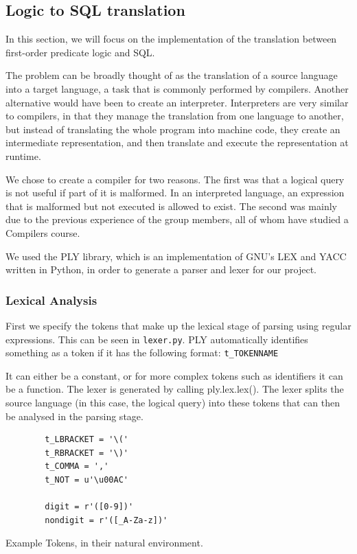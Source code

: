 \documentclass[a4paper, 11pt]{article}
\begin{document}
    \subsection{Logic to SQL translation}
      In this section, we will focus on the implementation of the translation
      between first-order predicate logic and SQL.

      The problem can be broadly thought of as the translation of a source
      language into a target language, a task that is commonly performed by
      compilers. Another alternative would have been to create an interpreter.
      Interpreters are very similar to compilers, in that they manage the
      translation from one language to another, but instead of translating the
      whole program into machine code, they create an intermediate
      representation, and then translate and execute the representation at
      runtime.

      We chose to create a compiler for two reasons. The first was that a
      logical query is not useful if part of it is malformed. In an interpreted
      language, an expression that is malformed but not executed is allowed to
      exist. The second was mainly due to the previous experience of the group
      members, all of whom have studied a Compilers course.

      We used the PLY library, which is an implementation of GNU's LEX and YACC
      written in Python, in order to generate a parser and lexer for our
      project.
    \subsubsection{Lexical Analysis}

      First we specify the tokens that make up the lexical stage of parsing
      using regular expressions. This can be seen in
      \texttt{lexer.py}. PLY automatically identifies something as a token if it
      has the following format: \texttt{t\_TOKENNAME}

      It can either be a constant, or for more complex tokens such as
      identifiers it can be a function.
      The lexer is generated by calling ply.lex.lex(). The lexer splits the
      source language (in this case, the logical query) into these tokens that
      can then be analysed in the parsing stage.

      \begin{center}
        \begin{verbatim}
        t_LBRACKET = '\('
        t_RBRACKET = '\)'
        t_COMMA = ','
        t_NOT = u'\u00AC'

        digit = r'([0-9])'
        nondigit = r'([_A-Za-z])'
        \end{verbatim}
        Example Tokens, in their natural environment. 
      \end{center}
\end{document}
